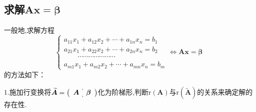 \subsection{求解$\bm{Ax}=\bm{\beta}$}
\begin{formal}
\begin{theorem}[求解$\bm{Ax}=\bm{\beta}$的方法]\label{thm:求解Ax=b的方法}
一般地,求解方程
\[
\begin{cases*}
    a_{11}x_1+a_{12}x_2+\cdots+a_{1n}x_n = b_1 \\
    a_{21}x_1+a_{22}x_2+\cdots+a_{2n}x_n=b_2\\
    \qquad\cdots\cdots\cdots\cdots\cdots
    \cdots\cdots \\
    a_{m1}x_1+a_{m2}x_2+\cdots+a_{mn}x_n=b_m
\end{cases*}\Longleftrightarrow
\bm{Ax}=\bm{\beta}
\]
的方法如下：

$1.$施加行变换将$\widetilde{\bm{A}}
    =\left (
    \begin{array}{c:c}
        \begin{matrix}
            \bm{A}
        \end{matrix}
        &
        \begin{matrix}
            \bm{\beta}
        \end{matrix}
    \end{array}
    \right )$化为阶梯形,判断$\mathrm{r}\left(\bm{A}
    \right)$与$\mathrm{r}\left(\widetilde{
        \bm{A}
    }\right)$的关系来确定解的存在性.


\end{theorem}
\end{formal}
